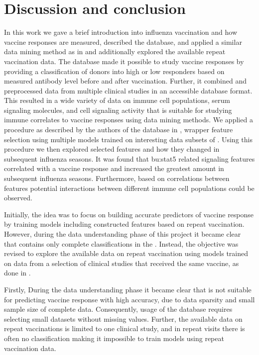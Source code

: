\section{Discussion and conclusion}

In this work we gave a brief introduction into influenza vaccination and how vaccine responses are measured, described the \flup database, and applied a similar data mining method as in \spaper and additionally explored the available repeat vaccination data.
The \flup database made it possible to study vaccine responses by providing a classification of donors into high or low responders based on measured antibody level before and after vaccination.
Further, it combined and preprocessed data from multiple clinical studies in an accessible database format.
This resulted in a wide variety of data on immune cell populations, serum signaling molecules, and cell signaling activity that is suitable for studying immune correlates to vaccine responses using data mining methods.
We applied a procedure as described by the authors of the \flup database in \spaper, wrapper feature selection using multiple models trained on interesting data subsets of \flup.
Using this procedure we then explored selected features and how they changed in subsequent influenza seasons.
It was found that \gls{bu:stat}5 related signaling features correlated with a vaccine response and increased the greatest amount in subsequent influenza seasons.
Furthermore, based on correlations between features potential interactions between different immune cell populations could be observed.

Initially, the idea was to focus on building accurate predictors of vaccine response by training models including constructed features based on repeat vaccination.
However, during the data understanding phase of this project it became clear that \flup contains only complete classifications in the \firstvis.
Instead, the objective was revised to explore the available data on repeat vaccination using models trained on \firstvis data from a selection of clinical studies that received the same vaccine, as done in \spaper.

Firstly, During the data understanding phase it became clear that \flup is not suitable for predicting vaccine response with high accuracy, due to data sparsity and small sample size of complete data.
Consequently, usage of the \flup database requires selecting small datasets without missing values.
Further, the available data on repeat vaccinations is limited to one clinical study, and in repeat visits there is often no classification making it impossible to train models using repeat vaccination data.

